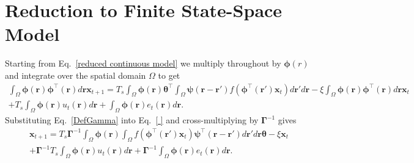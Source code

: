 \documentclass[12pt]{iopart}
\begin{document}
\section{Reduction to Finite State-Space Model}\label{Simplifying Decomposition} Starting from Eq.~\ref{reduced continuous model} we multiply throughout by $\boldsymbol{\phi}(r)$ and integrate over the spatial domain $\Omega$ to get 
\begin{eqnarray}
	\label{ReducingState} \int_\Omega {\boldsymbol{\phi} \left(\mathbf{r}\right)\boldsymbol{\phi}^{\top}\left(\mathbf{r}\right) d\mathbf{r}} \mathbf{x}_{t+1} = T_s \int_\Omega {\boldsymbol{\phi} (\mathbf{r}) \boldsymbol{\theta}^{\top} \int_\Omega {\boldsymbol{\psi} \left(\mathbf{r}-\mathbf{r}'\right) f\left(\boldsymbol{\phi}^{\top}\left(\mathbf{r}'\right) \mathbf{x}_t \right)d\mathbf{r}'}d\mathbf{r}} - \xi\int_\Omega {\boldsymbol{\phi}(\mathbf{r})\boldsymbol{\phi}^{\top}(\mathbf{r})d\mathbf{r}} \mathbf{x}_t \\
	+ T_s \int_\Omega{\boldsymbol{\phi} \left(\mathbf{r}\right) u_t\left(\mathbf{r}\right)d\mathbf{r}} + \int_\Omega{\boldsymbol{\phi} \left(\mathbf{r}\right) e_t\left(\mathbf{r}\right)d\mathbf{r}}. 
\end{eqnarray}
Substituting Eq.~\ref{DefGamma} into Eq.~\ref{ } and cross-multiplying by $\boldsymbol{\Gamma}^{-1}$ gives 
\begin{eqnarray}
	\label{Homogeneous SS Model} \mathbf{x}_{t+1} = T_s\boldsymbol{\Gamma}^{ - 1}\int_\Omega {\boldsymbol{\phi}\left(\mathbf{r}\right) \int_\Omega {f\left(\boldsymbol{\phi}^{\top}\left(\mathbf{r}'\right)\mathbf{x}_t\right) \boldsymbol{\psi}^{\top} \left(\mathbf{r}-\mathbf{r}'\right)d\mathbf{r}'} d\mathbf{r}} \boldsymbol{\theta} - \xi \mathbf{x}_t \\
	+ \boldsymbol{\Gamma}^{-1}T_s \int_\Omega{\boldsymbol{\phi} \left(\mathbf{r}\right) u_t\left(\mathbf{r}\right)d\mathbf{r}} + \boldsymbol{\Gamma}^{-1} \int_\Omega{\boldsymbol{\phi}\left(\mathbf{r}\right)e_t\left(\mathbf{r}\right)d\mathbf{r}}. 
\end{eqnarray}
\end{document}
